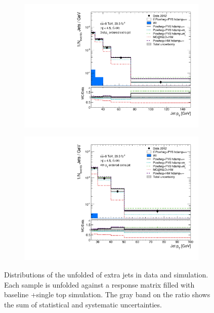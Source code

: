 \begin{figure}
\begin{subfigure}[]{0.45\textwidth}
\end{subfigure} \\
\begin{subfigure}[]{0.45\textwidth}
\includegraphics[width=\textwidth]{fig/DataUnfold/NLO/PtJet2.pdf}
\end{subfigure}
\begin{subfigure}[]{0.45\textwidth}
\includegraphics[width=\textwidth]{fig/DataUnfold/NLO/PtJet3.pdf}
\end{subfigure} 
\caption{Distributions of the unfolded \pt of extra jets in data and simulation. Each sample is unfolded against a response matrix filled with baseline \ttbar+single top simulation. The gray band on the ratio shows the sum of statistical and systematic uncertainties.}
\label{fig:unfpt}
\end{figure}

